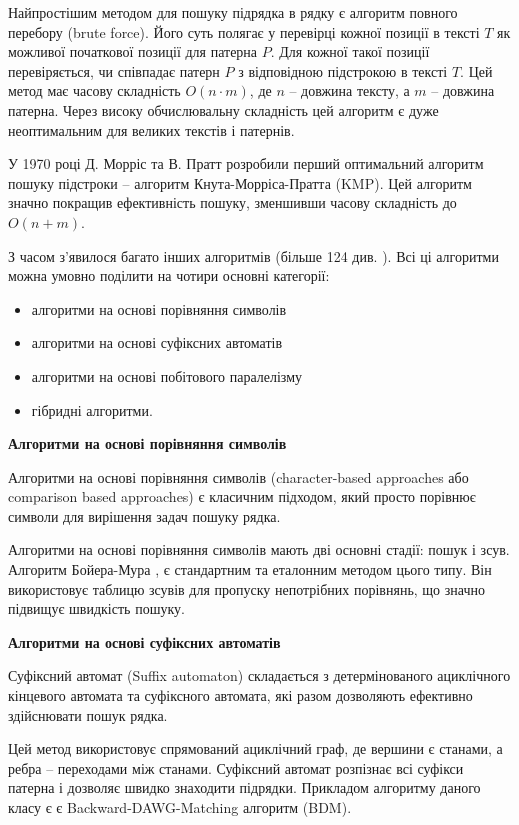 \documentclass[a4paper,14pt]{extarticle} %
\begin{document}
	Найпростішим методом для пошуку підрядка в рядку є алгоритм повного перебору (brute force). Його суть полягає у перевірці кожної позиції в тексті \( T \) як можливої початкової позиції для патерна \( P \). Для кожної такої позиції перевіряється, чи співпадає патерн \( P \) з відповідною підстрокою в тексті \( T \). Цей метод має часову складність \( O(n \cdot m) \), де \( n \) – довжина тексту, а \( m \) – довжина патерна. Через високу обчислювальну складність цей алгоритм є дуже неоптимальним для великих текстів і патернів.

	У 1970 році Д. Морріс та В. Пратт \cite{morris-pratt} розробили перший оптимальний алгоритм пошуку підстроки – алгоритм Кнута-Морріса-Пратта (KMP). Цей алгоритм значно покращив ефективність пошуку, зменшивши часову складність до \( O(n + m) \).

	З часом з'явилося багато інших алгоритмів (більше 124 див. \cite{smart}). Всі ці алгоритми можна умовно поділити на чотири основні категорії:
	\begin{itemize}
		\item алгоритми на основі порівняння символів
		\item  алгоритми на основі суфіксних автоматів
		\item алгоритми на основі побітового паралелізму
		\item гібридні алгоритми.
	\end{itemize}

\textbf{Алгоритми на основі порівняння символів}

Алгоритми на основі порівняння символів (character-based approaches або comparison based approaches) є класичним підходом, який просто порівнює символи для вирішення задач пошуку рядка.

Алгоритми на основі порівняння символів мають дві основні стадії: пошук і зсув. Алгоритм Бойера-Мура \cite{bm}, є стандартним та еталонним методом цього типу. Він використовує таблицю зсувів для пропуску непотрібних порівнянь, що значно підвищує швидкість пошуку.

\textbf{Алгоритми на основі суфіксних автоматів}

Суфіксний автомат (Suffix automaton) складається з детермінованого ациклічного кінцевого автомата та суфіксного автомата, які разом дозволяють ефективно здійснювати пошук рядка.

Цей метод використовує спрямований ациклічний граф, де вершини є станами, а ребра – переходами між станами. Суфіксний автомат розпізнає всі суфікси патерна і дозволяє швидко знаходити підрядки.
Прикладом алгоритму даного класу є є Backward-DAWG-Matching алгоритм (BDM).
\end{document}
